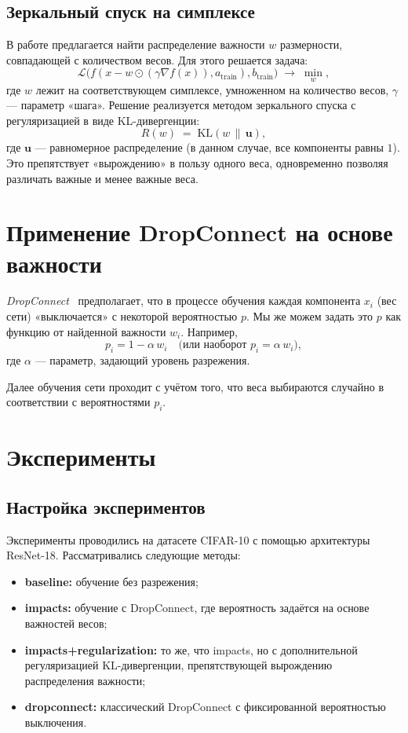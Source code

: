 \documentclass{article}
\begin{document}
\subsection{Зеркальный спуск на симплексе}
В работе предлагается найти распределение важности $w$ размерности, совпадающей с количеством весов. Для этого решается задача:
\begin{equation}
    \mathcal{L}\bigl(f(x - w \odot (\gamma \nabla f(x)), a_{\text{train}}), b_{\text{train}}\bigr)
    \;\to\; \min_{w}, 
\end{equation}
где $w$ лежит на соответствующем симплексе, умноженном на количество весов, $\gamma$ --- параметр «шага». Решение реализуется методом зеркального спуска с регуляризацией в виде KL-дивергенции:
\begin{equation}
    R(w) \;=\; \mathrm{KL}(w \,\|\, \boldsymbol{u}),
\end{equation}
где $\boldsymbol{u}$ --- равномерное распределение (в данном случае, все компоненты равны $1$). Это препятствует «вырождению» в пользу одного веса, одновременно позволяя различать важные и менее важные веса.

\section{Применение DropConnect на основе важности}
\label{sec:dropconnect}

\textit{DropConnect}~\citep{wan2013regularization} предполагает, что в процессе обучения каждая компонента $x_i$ (вес сети) «выключается» с некоторой вероятностью $p$. Мы же можем задать это $p$ как функцию от найденной важности $w_i$. Например,
\[
    p_i = 1 - \alpha \, w_i \quad \text{(или наоборот } p_i = \alpha \, w_i \text{)}, 
\]
где $\alpha$ --- параметр, задающий уровень разрежения.

Далее обучения сети проходит с учётом того, что веса выбираются случайно в соответствии с вероятностями $p_i$.

\section{Эксперименты}
\label{sec:experiments}

\subsection{Настройка экспериментов}
Эксперименты проводились на датасете CIFAR-10 с помощью архитектуры ResNet-18. Рассматривались следующие методы:
\begin{itemize}
    \item \textbf{baseline:} обучение без разрежения;
    \item \textbf{impacts:} обучение с DropConnect, где вероятность задаётся на основе важностей весов;
    \item \textbf{impacts+regularization:} то же, что impacts, но с дополнительной регуляризацией KL-дивергенции, препятствующей вырождению распределения важности;
    \item \textbf{dropconnect:} классический DropConnect с фиксированной вероятностью выключения.
\end{itemize}
\end{document}

